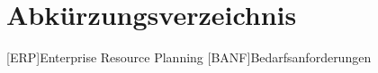 \chapter*{Abkürzungsverzeichnis}
\begin{acronym}
    [ERP]{Enterprise Resource Planning}
    [BANF]{Bedarfsanforderungen}
\end{acronym}
